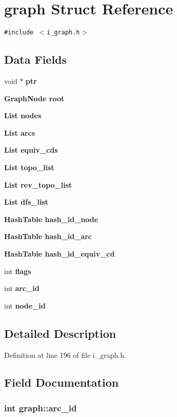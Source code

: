 \section{graph Struct Reference}
\label{structgraph}
{\tt \#include $<$i\_\-graph.h$>$}

\subsection*{Data Fields}
\begin{CompactItemize}
\item 
void $\ast$ \bf{ptr}
\item 
\bf{Graph\-Node} \bf{root}
\item 
\bf{List} \bf{nodes}
\item 
\bf{List} \bf{arcs}
\item 
\bf{List} \bf{equiv\_\-cds}
\item 
\bf{List} \bf{topo\_\-list}
\item 
\bf{List} \bf{rev\_\-topo\_\-list}
\item 
\bf{List} \bf{dfs\_\-list}
\item 
\bf{Hash\-Table} \bf{hash\_\-id\_\-node}
\item 
\bf{Hash\-Table} \bf{hash\_\-id\_\-arc}
\item 
\bf{Hash\-Table} \bf{hash\_\-id\_\-equiv\_\-cd}
\item 
int \bf{flags}
\item 
int \bf{arc\_\-id}
\item 
int \bf{node\_\-id}
\end{CompactItemize}


\subsection{Detailed Description}




Definition at line 196 of file i\_\-graph.h.

\subsection{Field Documentation}
\subsubsection{\setlength{\rightskip}{0pt plus 5cm}int \bf{graph::arc\_\-id}}\label{structgraph_6e79670fdbe4c6b9fc6d38629313ca18}




